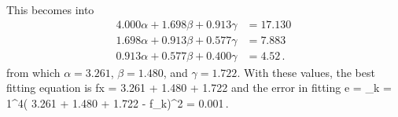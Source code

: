 %
This becomes into
%
\begin{align*}
    4.000\alpha + 1.698\beta + 0.913\gamma &= 17.130\,\\
    1.698\alpha + 0.913\beta + 0.577\gamma &= 7.883\,\\
    0.913\alpha + 0.577\beta + 0.400\gamma &= 4.52\,.
\end{align*}
%
from which $\alpha = 3.261$, $\beta = 1.480$, and $\gamma = 1.722$. With these values, the best fitting equation is
%
\beq
    f\vat x = 3.261 + 1.480 + 1.722
\eeq
%
and the error in fitting
%
\beq
    e = \sum_{k = 1}^4\left( 3.261 + 1.480 + 1.722 - f_k\right)^2 
      = 0.001\,. \mqed
\eeq
